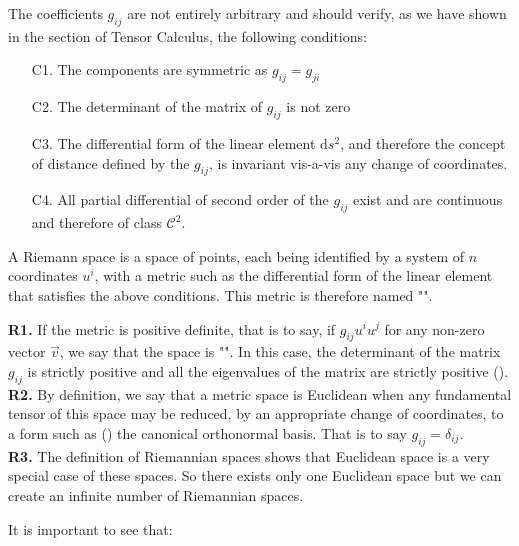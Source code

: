 	The coefficients $g_{ij}$ are not entirely arbitrary and should verify, as we have shown in the section of Tensor Calculus, the following conditions:
	\begin{enumerate}
		\item[C1.] The components are symmetric as $g_{ij}=g_{ji}$
		
		\item[C2.] The determinant of the matrix of $g_{ij}$ is not zero
		
		\item[C3.] The differential form of the linear element  $\mathrm{d}s^2$, and therefore the concept of distance defined by the $g_{ij}$, is invariant vis-a-vis any change of coordinates.
		
		\item[C4.] All partial differential of second order of the $g_{ij}$ exist and are continuous and therefore of class $\mathcal{C}^2$.
		\end{enumerate}
		A Riemann space is a space of points, each being identified by a system of $n$ coordinates $u^i$, with a metric such as the differential form of the linear element that satisfies the above conditions. This metric is therefore named "".
		
	\begin{tcolorbox}[title=Remarks,colframe=black,arc=10pt]
	\textbf{R1.} If the metric is positive definite, that is to say, if $g_{ij}u^iu^j$ for any non-zero vector $\vec{v}$, we say that the space is "". In this case, the determinant of the matrix $g_{ij}$ is strictly positive and all the eigenvalues of the matrix are strictly positive ().\\
	
	\textbf{R2.} By definition, we say that a metric space is Euclidean when any fundamental tensor of this space may be reduced, by an appropriate change of coordinates, to a form such as () the canonical orthonormal basis. That is to say $g_{ij} =\delta_{ij}$.\\
	
	\textbf{R3.} The definition of Riemannian spaces shows that Euclidean space is a very special case of these spaces. So there exists only one Euclidean space but we can create an infinite number of Riemannian spaces.
	\end{tcolorbox}
	It is important to see that:
	
